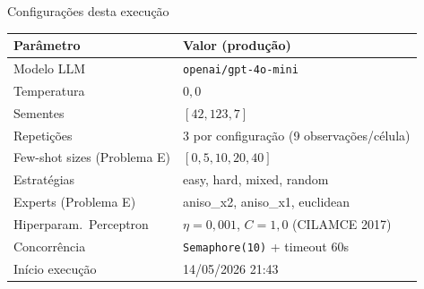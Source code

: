 \documentclass[aspectratio=169,10pt]{beamer}
\begin{document}
\begin{frame}{Configura\c{c}\~oes desta execu\c{c}\~ao}
  \footnotesize
  \begin{center}
  \begin{tabular}{ll}
    \toprule
    \textbf{Par\^ametro} & \textbf{Valor (produ\c{c}\~ao)} \\
    \midrule
    Modelo LLM & \texttt{openai/gpt-4o-mini} \\
    Temperatura & $0{,}0$ \\
    Sementes & $[42, 123, 7]$ \\
    Repeti\c{c}\~oes & 3 por configura\c{c}\~ao (9 observa\c{c}\~oes/c\'elula) \\
    Few-shot sizes (Problema E) & $[0, 5, 10, 20, 40]$ \\
    Estrat\'egias & easy, hard, mixed, random \\
    Experts (Problema E) & aniso\_x2, aniso\_x1, euclidean \\
    Hiperparam.\ Perceptron & $\eta=0{,}001$, $C=1{,}0$ (CILAMCE 2017) \\
    Concorr\^encia & \texttt{Semaphore(10)} + timeout 60s \\
    In\'icio execu\c{c}\~ao & 14/05/2026 21:43 \\
    \bottomrule
  \end{tabular}
  \end{center}
\end{frame}
\end{document}
